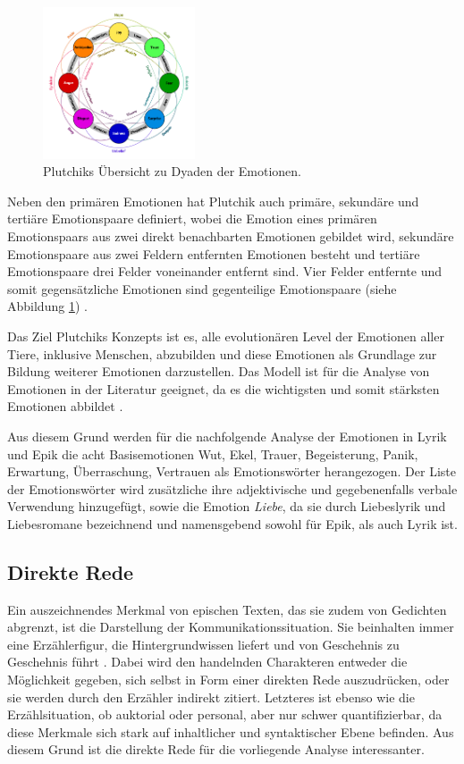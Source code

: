 \documentclass[a4paper,10p]{article}
\begin{document}
\begin{figure}
	\includegraphics[width=0.4\textwidth]{Plutchik_Dyads.png}
	\caption{Plutchiks Übersicht zu Dyaden der Emotionen.}
	\label{fig:Dyads}
\end{figure}


Neben den primären Emotionen hat Plutchik auch primäre, sekundäre und tertiäre Emotionspaare definiert, wobei die Emotion eines primären Emotionspaars aus zwei direkt benachbarten Emotionen gebildet wird, sekundäre Emotionspaare aus zwei Feldern entfernten Emotionen besteht und tertiäre Emotionspaare drei Felder voneinander entfernt sind. Vier Felder entfernte und somit gegensätzliche Emotionen sind gegenteilige Emotionspaare (siehe Abbildung \ref{fig:Dyads}) \citep[vgl.][S. 40-122]{Plutchik}.\par 

Das Ziel Plutchiks Konzepts ist es, alle evolutionären Level der Emotionen aller Tiere, inklusive Menschen, abzubilden und diese Emotionen als Grundlage zur Bildung weiterer Emotionen darzustellen. Das Modell ist für die Analyse von Emotionen in der Literatur geeignet, da es die wichtigsten und somit stärksten Emotionen abbildet \citep[vgl.][S. 40-122]{Plutchik}. \par 

Aus diesem Grund werden für die nachfolgende Analyse der Emotionen in Lyrik und Epik die acht Basisemotionen Wut, Ekel, Trauer, Begeisterung, Panik, Erwartung, Überraschung, Vertrauen als Emotionswörter herangezogen. Der Liste der Emotionswörter wird zusätzliche ihre adjektivische und gegebenenfalls verbale Verwendung hinzugefügt, sowie die Emotion \textit{Liebe}, da sie durch Liebeslyrik und Liebesromane bezeichnend und namensgebend sowohl für Epik, als auch Lyrik ist. 
 

\subsection{Direkte Rede}
Ein auszeichnendes Merkmal von epischen Texten, das sie zudem von Gedichten abgrenzt, ist die Darstellung der Kommunikationssituation. Sie beinhalten immer eine Erzählerfigur, die Hintergrundwissen liefert und von Geschehnis zu Geschehnis führt \citep[vgl.][S. 9]{Bloss2005}. Dabei wird den handelnden Charakteren entweder die Möglichkeit gegeben, sich selbst in Form einer direkten Rede auszudrücken, oder sie werden durch den Erzähler indirekt zitiert. Letzteres ist ebenso wie die Erzählsituation, ob auktorial oder personal, aber nur schwer quantifizierbar, da diese Merkmale sich stark auf inhaltlicher und syntaktischer Ebene befinden. Aus diesem Grund ist die direkte Rede für die vorliegende Analyse interessanter.\par 
\end{document}
